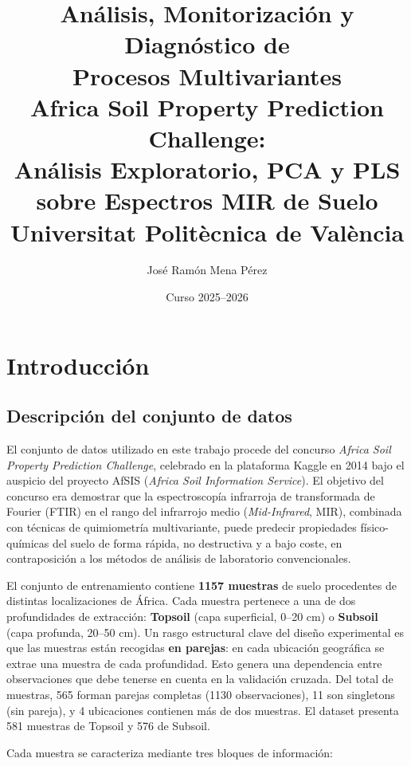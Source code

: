 \documentclass[12pt, a4paper]{article}
\title{
  \vspace{-1cm}
  {\Large \textbf{Análisis, Monitorización y Diagnóstico de\\[4pt]
  Procesos Multivariantes}}\\[0.8cm]
  {\large Africa Soil Property Prediction Challenge:\\[2pt]
  Análisis Exploratorio, PCA y PLS sobre Espectros MIR de Suelo}\\[1cm]
  {\normalsize Universitat Politècnica de València}
}
\author{José Ramón Mena Pérez}
\date{Curso 2025--2026}
\begin{document}
\maketitle
\thispagestyle{fancy}
\vspace{1cm}

\tableofcontents
\newpage

\section{Introducción}

\subsection{Descripción del conjunto de datos}

El conjunto de datos utilizado en este trabajo procede del concurso \textit{Africa Soil
Property Prediction Challenge}, celebrado en la plataforma Kaggle en 2014 bajo el
auspicio del proyecto AfSIS (\textit{Africa Soil Information Service}). El objetivo del
concurso era demostrar que la espectroscopía infrarroja de transformada de Fourier (FTIR)
en el rango del infrarrojo medio (\textit{Mid-Infrared}, MIR), combinada con técnicas de
quimiometría multivariante, puede predecir propiedades físico-químicas del suelo de forma
rápida, no destructiva y a bajo coste, en contraposición a los métodos de análisis de
laboratorio convencionales.

El conjunto de entrenamiento contiene \textbf{1157 muestras} de suelo procedentes de
distintas localizaciones de África. Cada muestra pertenece a una de dos profundidades de
extracción: \textbf{Topsoil} (capa superficial, 0--20 cm) o \textbf{Subsoil} (capa
profunda, 20--50 cm). Un rasgo estructural clave del diseño experimental es que las
muestras están recogidas \textbf{en parejas}: en cada ubicación geográfica se extrae una
muestra de cada profundidad. Esto genera una dependencia entre observaciones que debe
tenerse en cuenta en la validación cruzada. Del total de muestras, 565 forman parejas
completas (1130 observaciones), 11 son singletons (sin pareja), y 4 ubicaciones contienen
más de dos muestras. El dataset presenta 581 muestras de Topsoil y 576 de Subsoil.

Cada muestra se caracteriza mediante tres bloques de información:
\end{document}
